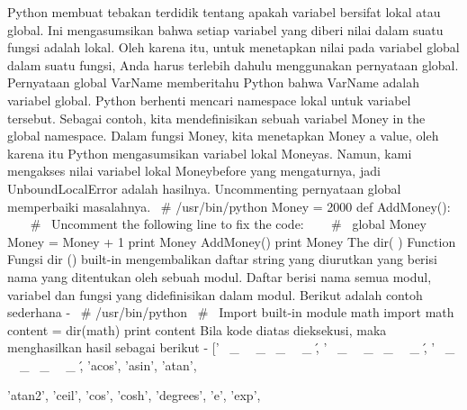 Python membuat tebakan terdidik tentang apakah variabel bersifat lokal atau global. Ini mengasumsikan bahwa setiap variabel yang diberi nilai dalam suatu fungsi adalah lokal.  
Oleh karena itu, untuk menetapkan nilai pada variabel global dalam suatu fungsi, Anda harus terlebih dahulu menggunakan pernyataan global.  
Pernyataan global VarName memberitahu Python bahwa VarName adalah variabel global. Python berhenti mencari namespace lokal untuk variabel tersebut. 
Sebagai contoh, kita mendefinisikan sebuah variabel Money in the global namespace. Dalam fungsi Money, kita menetapkan Money a value, oleh karena itu Python mengasumsikan variabel lokal Moneyas. Namun, kami mengakses nilai variabel lokal Moneybefore yang mengaturnya, jadi UnboundLocalError adalah hasilnya. Uncommenting pernyataan global memperbaiki masalahnya. 
 \hspace*{0.5in}  \  \#  \!/usr/bin/python  
 \hspace*{0.5in} Money = 2000  
 \hspace*{0.5in} def AddMoney():  
 \hspace*{0.5in} ~~  \  \#  \ Uncomment the following line to fix the code:  
 \hspace*{0.5in} ~~  \  \#  \ global Money  
 \hspace*{0.5in} ~~ Money = Money + 1  
 \hspace*{0.5in} print Money  
 \hspace*{0.5in} AddMoney() 
 \hspace*{0.5in} print Money  
The dir( ) Function  
Fungsi dir () built-in mengembalikan daftar string yang diurutkan yang berisi nama yang ditentukan oleh sebuah modul. 
Daftar berisi nama semua modul, variabel dan fungsi yang didefinisikan dalam modul. Berikut adalah contoh sederhana - 
 \hspace*{0.5in}  \  \#  \!/usr/bin/python 
 \hspace*{0.5in}  \  \#  \ Import built-in module math  
 \hspace*{0.5in} import math  
 \hspace*{0.5in} content = dir(math) 
 \hspace*{0.5in} print content 
Bila kode diatas dieksekusi, maka menghasilkan hasil sebagai berikut - 
 \hspace*{0.5in} [' \  \_  \ \  \_  \doc \  \_  \ \  \_  \', ' \  \_  \ \  \_  \file \  \_  \ \  \_  \', ' \  \_  \ \  \_  \name \  \_  \ \  \_  \', 'acos', 'asin', 'atan',  \par
\noindent 
 \hspace*{0.5in} 'atan2', 'ceil', 'cos', 'cosh', 'degrees', 'e', 'exp',   
